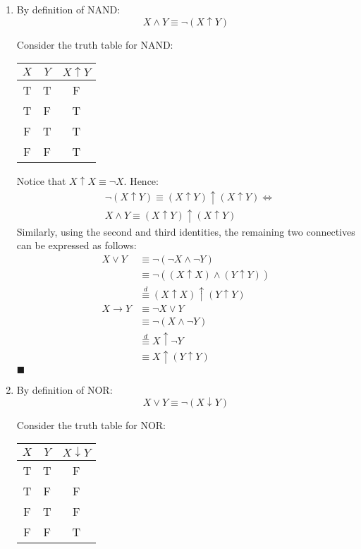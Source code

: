 \documentclass[12pt]{article}
\newcommand{\p}[1]{\item[\textnormal{(#1)}]}
\newcommand{\q}{\hfill $\blacksquare$}
\newenvironment{ps}
{\begin{enumerate}[leftmargin=0em, itemindent=1.5em]}
{\end{enumerate}}
\begin{document}
\begin{ps}
    \p{c} By definition of NAND: 
        \[
            X \wedge Y \equiv \neg (X \uparrow Y)
        \]   

        Consider the truth table for NAND:

        \begin{center}
        \begin{tabular}{|c|c|c|}
        \hline
        $X$ & $Y$ & $X \uparrow Y$ \\
        \hline
        T & T & F \\
        T & F & T \\
        F & T & T \\
        F & F & T \\
        \hline
        \end{tabular}
        \end{center}

        Notice that \( X \uparrow X \equiv \neg X \). Hence: 
        \begin{align*}
            &\neg (X \uparrow Y) \equiv (X \uparrow Y) \uparrow (X \uparrow Y) \Leftrightarrow \\
            &X \wedge Y \equiv (X \uparrow Y) \uparrow (X \uparrow Y)
        \end{align*}
        Similarly, using the second and third identities, the remaining two connectives can be
        expressed as follows: 
        \begin{align*}
            X \vee Y &\equiv \neg (\neg X \wedge \neg Y) \\
                     &\equiv \neg ((X \uparrow X) \wedge (Y \uparrow Y)) \\
                     &\overset{d}{\equiv} (X \uparrow X) \uparrow (Y \uparrow Y) \\
            X \rightarrow Y &\equiv \neg X \vee Y \\
                            &\equiv \neg (X \wedge \neg Y) \\
                            &\overset{d}{\equiv} X \uparrow \neg Y \\
                            &\equiv X \uparrow (Y \uparrow Y)
        \end{align*} \q

    \p{d} By definition of NOR: 
        \[
            X \vee Y \equiv \neg (X \downarrow Y)
        \]   

        Consider the truth table for NOR:

        \begin{center}
        \begin{tabular}{|c|c|c|}
        \hline
        $X$ & $Y$ & $X \downarrow Y$ \\
        \hline
        T & T & F \\
        T & F & F \\
        F & T & F \\
        F & F & T \\
        \hline
        \end{tabular}
        \end{center}


\end{ps}
\end{document}
